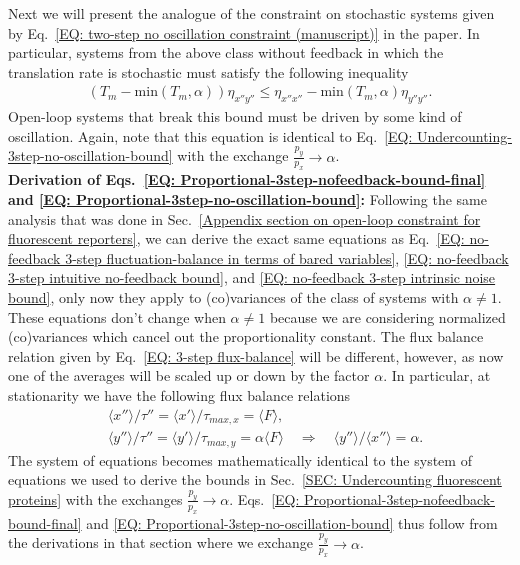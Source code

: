 \documentclass[%
 reprint,prx,
superscriptaddress,
%
%
%
%
%
%
%
%
%
 amsmath,amssymb,
 aps,
%
%
%
%
%
%
]{revtex4-2}
\newlength{\arrow}
\begin{document}
{{Next we will present the analogue of the constraint on stochastic systems given by Eq.~\eqref{EQ: two-step no oscillation constraint (manuscript)} in the paper. In particular, systems from the above class without feedback in which the translation rate is stochastic must satisfy the following inequality
\begin{align}
    \left(T_{m} - \text{min}\left(T_{m},\alpha \right)\right)\eta_{x''y''} \leq \eta_{x''x''} - \text{min}\left(T_{m}, \alpha \right)\eta_{y''y''}   .  
\label{EQ: Proportional-3step-no-oscillation-bound}
\end{align}
Open-loop systems that break this bound must be driven by some kind of oscillation. Again, note that this equation is identical to Eq.~\eqref{EQ: Undercounting-3step-no-oscillation-bound} with the exchange $\frac{p_{y}}{p_{x}} \to \alpha$.\\

\noindent \textbf{Derivation of Eqs.~\eqref{EQ: Proportional-3step-nofeedback-bound-final} and \eqref{EQ: Proportional-3step-no-oscillation-bound}:} Following the same analysis that was done in Sec.~\ref{Appendix section on open-loop constraint for fluorescent reporters}, we can derive the exact same equations as Eq.~\eqref{EQ: no-feedback 3-step fluctuation-balance in terms of bared variables}, \eqref{EQ: no-feedback 3-step intuitive no-feedback bound}, and \eqref{EQ: no-feedback 3-step intrinsic noise bound}, only now they apply to (co)variances of the class of systems with $\alpha \neq 1$. These equations don't change when $\alpha \neq 1$ because we are considering normalized (co)variances which cancel out the proportionality constant. The flux balance relation given by Eq.~\eqref{EQ: 3-step flux-balance} will be different, however, as now one of the averages will be scaled up or down by the factor $\alpha$. In particular, at stationarity we have the following flux balance relations \cite{Hilfinger2011}
\begin{align*}
 &\langle x'' \rangle / \tau'' = \langle x' \rangle /\tau_{max,x} = \langle F \rangle, \\ &\langle y'' \rangle / \tau'' = \langle y' \rangle /\tau_{max,y} = \alpha \langle F \rangle \quad \Rightarrow \quad \langle y'' \rangle / \langle x'' \rangle = \alpha .
\end{align*}
The system of equations becomes mathematically identical to the system of equations we used to derive the bounds in Sec.~\ref{SEC: Undercounting fluorescent proteins} with the exchanges $\frac{p_{y}}{p_{x}} \to \alpha$.  Eqs.~\eqref{EQ: Proportional-3step-nofeedback-bound-final} and \eqref{EQ: Proportional-3step-no-oscillation-bound} thus follow from the derivations in that section where we exchange $\frac{p_{y}}{p_{x}} \to \alpha$.




}}
\end{document}
